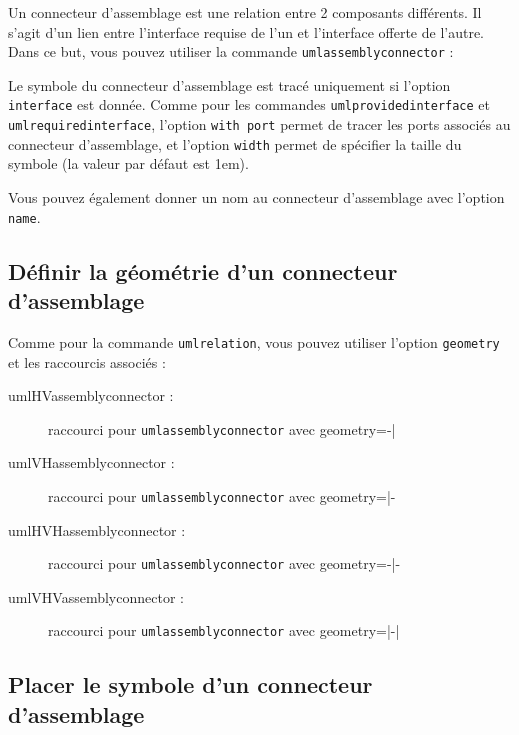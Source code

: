 \documentclass[a4paper,11pt]{report}
\newcommand{\inputTikZ}[1]{%
  }%
\newcommand{\inputTikZ}[1]{%
    \texttt{[image: fig/\#1.pdf]}%
  }%
\begin{document}
Un connecteur d'assemblage est une relation entre 2 composants différents. Il s'agit d'un lien entre l'interface requise de l'un et l'interface offerte de l'autre.
Dans ce but, vous pouvez utiliser la commande {\tt umlassemblyconnector} :

\medskip

\begin{minipage}{0.45\textwidth}

\end{minipage}
\begin{minipage}{0.55\textwidth}
\begin{center}
\inputTikZ{componentassemblyconnector}
\end{center}
\end{minipage}

\medskip

Le symbole du connecteur d'assemblage est tracé uniquement si l'option {\tt interface} est donnée. Comme pour les commandes {\tt umlprovidedinterface} et {\tt umlrequiredinterface}, l'option {\tt  with port} permet de tracer les ports associés au connecteur d'assemblage, et l'option {\tt width} permet de spécifier la taille du symbole (la valeur par défaut est 1em).

Vous pouvez également donner un nom au connecteur d'assemblage avec l'option {\tt name}.

\subsection{Définir la géométrie d'un connecteur d'assemblage}

Comme pour la commande {\tt umlrelation}, vous pouvez utiliser l'option {\tt geometry} et les raccourcis associés :

\begin{description}
\item[umlHVassemblyconnector :] raccourci pour {\tt umlassemblyconnector} avec geometry=-|
\item[umlVHassemblyconnector :] raccourci pour {\tt umlassemblyconnector} avec geometry=|-
\item[umlHVHassemblyconnector :] raccourci pour {\tt umlassemblyconnector} avec geometry=-|-
\item[umlVHVassemblyconnector :] raccourci pour {\tt umlassemblyconnector} avec geometry=|-|
\end{description}

\subsection{Placer le symbole d'un connecteur d'assemblage}
\end{document}
